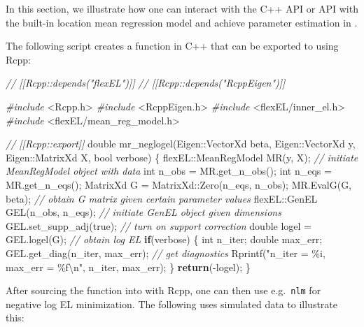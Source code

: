 \documentclass[article]{jss}
\newenvironment{Shaded}{\begin{snugshade}}{\end{snugshade}}
\newcommand{\CommentTok}[1]{\textcolor[rgb]{0.56,0.35,0.01}{\textit{#1}}}
\newcommand{\ControlFlowTok}[1]{\textcolor[rgb]{0.13,0.29,0.53}{\textbf{#1}}}
\newcommand{\DataTypeTok}[1]{\textcolor[rgb]{0.13,0.29,0.53}{#1}}
\newcommand{\ImportTok}[1]{#1}
\newcommand{\NormalTok}[1]{#1}
\newcommand{\PreprocessorTok}[1]{\textcolor[rgb]{0.56,0.35,0.01}{\textit{#1}}}
\newcommand{\SpecialCharTok}[1]{\textcolor[rgb]{0.00,0.00,0.00}{#1}}
\newcommand{\StringTok}[1]{\textcolor[rgb]{0.31,0.60,0.02}{#1}}
\renewcommand{\|}{\,|\,}
\begin{document}
In this section, we illustrate how one can interact with the C++ API or  API with the built-in location mean regression model and achieve parameter estimation in .

The following script creates a function in C++ that can be exported to  using Rcpp:

\begin{Shaded}
\begin{Highlighting}[]
\CommentTok{// [[Rcpp::depends("flexEL")]]}
\CommentTok{// [[Rcpp::depends("RcppEigen")]]}

\PreprocessorTok{\#include }\ImportTok{\textless{}Rcpp.h\textgreater{}}
\PreprocessorTok{\#include }\ImportTok{\textless{}RcppEigen.h\textgreater{}}
\PreprocessorTok{\#include }\ImportTok{\textless{}flexEL/inner\_el.h\textgreater{}}
\PreprocessorTok{\#include }\ImportTok{\textless{}flexEL/mean\_reg\_model.h\textgreater{}}

\CommentTok{// [[Rcpp::export]]}
\DataTypeTok{double}\NormalTok{ mr\_neglogel(Eigen::VectorXd beta,}
\NormalTok{                   Eigen::VectorXd y,}
\NormalTok{                   Eigen::MatrixXd X,}
                   \DataTypeTok{bool}\NormalTok{ verbose) \{}
\NormalTok{  flexEL::MeanRegModel MR(y, X); }\CommentTok{// initiate MeanRegModel object with data}
  \DataTypeTok{int}\NormalTok{ n\_obs = MR.get\_n\_obs();}
  \DataTypeTok{int}\NormalTok{ n\_eqs = MR.get\_n\_eqs();}
\NormalTok{  MatrixXd G = MatrixXd::Zero(n\_eqs, n\_obs);}
\NormalTok{  MR.EvalG(G, beta); }\CommentTok{// obtain G matrix given certain parameter values}
\NormalTok{  flexEL::GenEL GEL(n\_obs, n\_eqs); }\CommentTok{// initiate GenEL object given dimensions}
\NormalTok{  GEL.set\_supp\_adj(true); }\CommentTok{// turn on support correction}
  \DataTypeTok{double}\NormalTok{ logel = GEL.logel(G); }\CommentTok{// obtain log EL}
  \ControlFlowTok{if}\NormalTok{(verbose) \{}
    \DataTypeTok{int}\NormalTok{ n\_iter;}
    \DataTypeTok{double}\NormalTok{ max\_err;}
\NormalTok{    GEL.get\_diag(n\_iter, max\_err); }\CommentTok{// get diagnostics}
\NormalTok{    Rprintf(}\StringTok{"n\_iter = \%i, max\_err = \%f}\SpecialCharTok{\textbackslash{}n}\StringTok{"}\NormalTok{, n\_iter, max\_err);}
\NormalTok{  \}}
  \ControlFlowTok{return}\NormalTok{({-}logel);}
\NormalTok{\}}
\end{Highlighting}
\end{Shaded}

After sourcing the function into  with Rcpp, one can then use e.g.~\texttt{nlm} for negative log EL minimization. The following uses simulated data to illustrate this:
\end{document}
